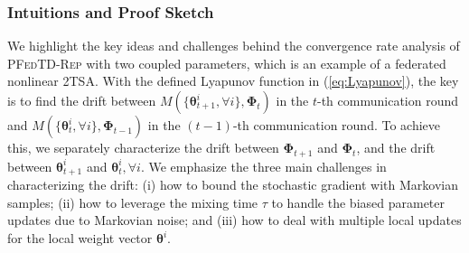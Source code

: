 \documentclass{article} %
\def\eqref#1{equation~\ref{#1}}
\theoremstyle{plain}
\theoremstyle{definition}
\theoremstyle{remark}
\renewcommand{\eqref}[1]{(\ref{#1})}
\newcommand{\FedTD}{\textsc{PFedTD-Rep}\xspace}
\begin{document}
\subsubsection{Intuitions and Proof Sketch}\label{sec:convergence-proof}


We highlight the key ideas and challenges behind the convergence rate analysis of \FedTD with two coupled parameters, which is an example of a federated nonlinear 2TSA.  With the defined Lyapunov function in \eqref{eq:Lyapunov}, the key is to find the drift between $M(\{\pmb{\theta}^i_{t+1}, \forall i\},\pmb{\Phi}_t)$ in the $t$-th communication round and $M(\{\pmb{\theta}^i_{t}, \forall i\},\pmb{\Phi}_{t-1})$ in the $(t-1)$-th communication round. To achieve this, we separately characterize the drift between $\pmb{\Phi}_{t+1}$ and $\pmb{\Phi}_t$, and the drift between $\pmb{\theta}^i_{t+1}$ and $\pmb{\theta}^i_t, \forall i$. We emphasize the three main challenges in characterizing the drift: (i) how to bound the stochastic gradient with Markovian samples; (ii) how to leverage the mixing time $\tau$ to handle the biased parameter updates due to Markovian noise; and (iii) how to deal with multiple local updates for the local weight vector $\pmb{\theta}^i$. 
\end{document}
